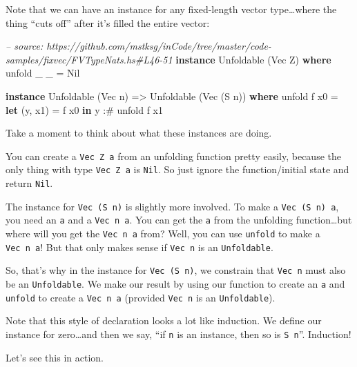 \documentclass[]{article}
\newenvironment{Shaded}{}{}
\newcommand{\KeywordTok}[1]{\textcolor[rgb]{0.00,0.44,0.13}{\textbf{#1}}}
\newcommand{\DataTypeTok}[1]{\textcolor[rgb]{0.56,0.13,0.00}{#1}}
\newcommand{\CommentTok}[1]{\textcolor[rgb]{0.38,0.63,0.69}{\textit{#1}}}
\newcommand{\OtherTok}[1]{\textcolor[rgb]{0.00,0.44,0.13}{#1}}
\newcommand{\FunctionTok}[1]{\textcolor[rgb]{0.02,0.16,0.49}{#1}}
\newcommand{\NormalTok}[1]{#1}
\begin{document}
Note that we can have an instance for any fixed-length vector type\ldots{}where
the thing ``cuts off'' after it's filled the entire vector:

\begin{Shaded}
\begin{Highlighting}[]
\CommentTok{-- source: https://github.com/mstksg/inCode/tree/master/code-samples/fixvec/FVTypeNats.hs#L46-51}
\KeywordTok{instance} \DataTypeTok{Unfoldable}\NormalTok{ (}\DataTypeTok{Vec} \DataTypeTok{Z}\NormalTok{) }\KeywordTok{where}
\NormalTok{    unfold _ _ }\FunctionTok{=} \DataTypeTok{Nil}

\KeywordTok{instance} \DataTypeTok{Unfoldable}\NormalTok{ (}\DataTypeTok{Vec}\NormalTok{ n) }\OtherTok{=>} \DataTypeTok{Unfoldable}\NormalTok{ (}\DataTypeTok{Vec}\NormalTok{ (}\DataTypeTok{S}\NormalTok{ n)) }\KeywordTok{where}
\NormalTok{    unfold f x0 }\FunctionTok{=} \KeywordTok{let}\NormalTok{ (y, x1) }\FunctionTok{=}\NormalTok{ f x0}
                  \KeywordTok{in}\NormalTok{  y }\FunctionTok{:#}\NormalTok{ unfold f x1}
\end{Highlighting}
\end{Shaded}

Take a moment to think about what these instances are doing.

You can create a \texttt{Vec\ Z\ a} from an unfolding function pretty easily,
because the only thing with type \texttt{Vec\ Z\ a} is \texttt{Nil}. So just
ignore the function/initial state and return \texttt{Nil}.

The instance for \texttt{Vec\ (S\ n)} is slightly more involved. To make a
\texttt{Vec\ (S\ n)\ a}, you need an \texttt{a} and a \texttt{Vec\ n\ a}. You
can get the \texttt{a} from the unfolding function\ldots{}but where will you get
the \texttt{Vec\ n\ a} from? Well, you can use \texttt{unfold} to make a
\texttt{Vec\ n\ a}! But that only makes sense if \texttt{Vec\ n} is an
\texttt{Unfoldable}.

So, that's why in the instance for \texttt{Vec\ (S\ n)}, we constrain that
\texttt{Vec\ n} must also be an \texttt{Unfoldable}. We make our result by using
our function to create an \texttt{a} and \texttt{unfold} to create a
\texttt{Vec\ n\ a} (provided \texttt{Vec\ n} is an \texttt{Unfoldable}).

Note that this style of declaration looks a lot like induction. We define our
instance for zero\ldots{}and then we say, ``if \texttt{n} is an instance, then
so is \texttt{S\ n}''. Induction!

Let's see this in action.
\end{document}
